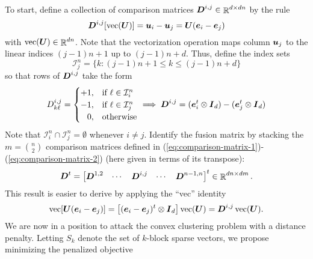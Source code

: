 \documentclass[11pt]{article}
\begin{document}
To start, define a collection of comparison matrices \(\boldsymbol{D}^{i,j} \in \mathop{\mathbb{R}}\nolimits^{d \times dn}\) by the rule
\begin{equation}
    \label{eq:comparison-matrix-1}
    \boldsymbol{D}^{i,j}[\mathop{\rm vec}\nolimits(\boldsymbol{U})]
    =
    \boldsymbol{u}_{i} - \boldsymbol{u}_{j}
    =
    \boldsymbol{U} (\boldsymbol{e}_{i} - \boldsymbol{e}_{j})
\end{equation}
with \(\mathop{\rm vec}\nolimits(\boldsymbol{U}) \in \mathop{\mathbb{R}}\nolimits^{dn}\).
Note that the vectorization operation maps column \(\boldsymbol{u}_{j}\) to the linear indices \((j-1)n + 1\) up to \((j-1)n + d\).
Thus, define the index sets
\begin{equation*}
    \label{eq:index-sets}
    \mathcal{I}_{j}^{n}
    =
    \{k : (j-1)n + 1 \le k \le (j-1)n + d\}
\end{equation*}
so that rows of \(\boldsymbol{D}^{i,j}\) take the form
\begin{equation}
    \label{eq:comparison-matrix-2}
    D_{k\ell}^{i,j}
    =
    \begin{cases}
        +1, & \text{if \(\ell \in \mathcal{I}_{i}^{n}\)} \\
        -1, & \text{if \(\ell \in \mathcal{I}_{j}^{n}\)} \\
        \phantom{+}0, & \text{otherwise}
    \end{cases}
    \implies
    \boldsymbol{D}^{i,j}
    =
    (\boldsymbol{e}_{i}^{t} \otimes \boldsymbol{I}_{d})
    -
    (\boldsymbol{e}_{j}^{t} \otimes \boldsymbol{I}_{d})
\end{equation}
Note that \(\mathcal{I}_{i}^{n} \cap \mathcal{I}_{j}^{n} = \emptyset\) whenever \(i \neq j\).
Identify the fusion matrix by stacking the \(m = \binom{n}{2}\) comparison matrices defined in (\ref{eq:comparison-matrix-1})-(\ref{eq:comparison-matrix-2}) (here given in terms of its transpose):
\begin{equation}
    \label{eq:fusion-matrix}
    \boldsymbol{D}^{t}
    =
    \begin{bmatrix}
        \boldsymbol{D}^{1,2}
        & \cdots
        & \boldsymbol{D}^{i,j}
        & \cdots
        & \boldsymbol{D}^{n-1,n}
    \end{bmatrix}^{t}
    \in
    \mathop{\mathbb{R}}\nolimits^{dn \times dm}.
\end{equation}
This result is easier to derive by applying the ``vec'' identity
\begin{equation*}
    \mathop{\rm vec}\nolimits[\boldsymbol{U} (\boldsymbol{e}_{i} - \boldsymbol{e}_{j})]
    =
    \left[(\boldsymbol{e}_{i} - \boldsymbol{e}_{j})^{t} \otimes \boldsymbol{I}_{d}\right] \mathop{\rm vec}\nolimits(\boldsymbol{U})
    =
    \boldsymbol{D}^{i,j} \mathop{\rm vec}\nolimits(\boldsymbol{U}).
\end{equation*}
We are now in a position to attack the convex clustering problem with a distance penalty.
Letting \(S_{k}\) denote the set of \(k\)-block sparse vectors, we propose minimizing the penalized objective
\end{document}
